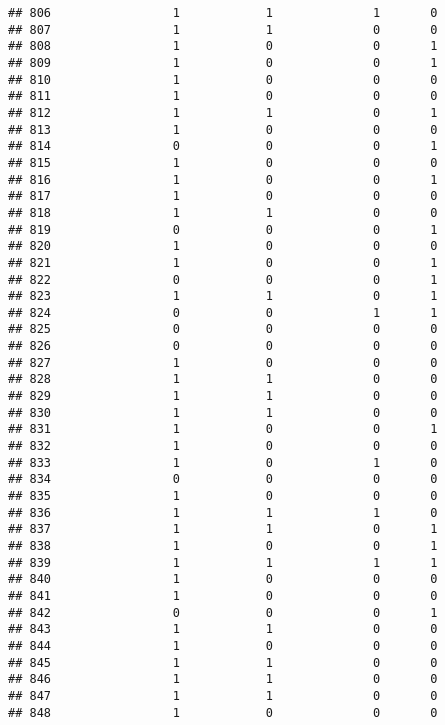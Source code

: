 \documentclass[]{article}
\begin{document}
\begin{verbatim}
## 806                 1            1              1       0
## 807                 1            1              0       0
## 808                 1            0              0       1
## 809                 1            0              0       1
## 810                 1            0              0       0
## 811                 1            0              0       0
## 812                 1            1              0       1
## 813                 1            0              0       0
## 814                 0            0              0       1
## 815                 1            0              0       0
## 816                 1            0              0       1
## 817                 1            0              0       0
## 818                 1            1              0       0
## 819                 0            0              0       1
## 820                 1            0              0       0
## 821                 1            0              0       1
## 822                 0            0              0       1
## 823                 1            1              0       1
## 824                 0            0              1       1
## 825                 0            0              0       0
## 826                 0            0              0       0
## 827                 1            0              0       0
## 828                 1            1              0       0
## 829                 1            1              0       0
## 830                 1            1              0       0
## 831                 1            0              0       1
## 832                 1            0              0       0
## 833                 1            0              1       0
## 834                 0            0              0       0
## 835                 1            0              0       0
## 836                 1            1              1       0
## 837                 1            1              0       1
## 838                 1            0              0       1
## 839                 1            1              1       1
## 840                 1            0              0       0
## 841                 1            0              0       0
## 842                 0            0              0       1
## 843                 1            1              0       0
## 844                 1            0              0       0
## 845                 1            1              0       0
## 846                 1            1              0       0
## 847                 1            1              0       0
## 848                 1            0              0       0

\end{verbatim}
\end{document}
